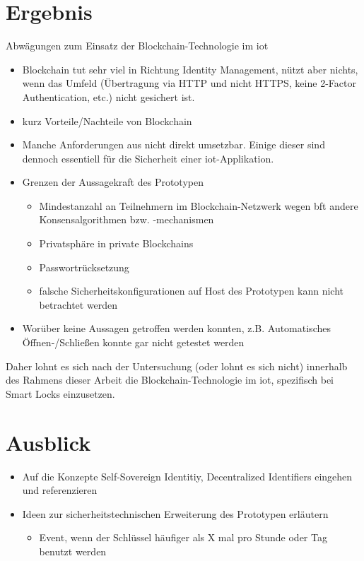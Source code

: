 \section{Ergebnis}
\label{sec:end}
    Abwägungen zum Einsatz der Blockchain-Technologie im \gls{iot}
    \begin{itemize}[noitemsep]
        \item Blockchain tut sehr viel in Richtung Identity Management, nützt aber nichts, wenn das Umfeld (Übertragung via HTTP und nicht HTTPS, keine 2-Factor Authentication, etc.) nicht gesichert ist.
        \item kurz Vorteile/Nachteile von Blockchain
        \item Manche Anforderungen aus  nicht direkt umsetzbar.
            Einige dieser sind dennoch essentiell für die Sicherheit einer \gls{iot}-Applikation.
        \item Grenzen der Aussagekraft des Prototypen
		    \begin{itemize}[noitemsep]
		        \item Mindestanzahl an Teilnehmern im Blockchain-Netzwerk wegen \gls{bft} \textrightarrow andere Konsensalgorithmen bzw. -mechanismen
		        \item Privatsphäre in private Blockchains
		        \item Passwortrücksetzung
		        \item falsche Sicherheitskonfigurationen auf Host des Prototypen kann nicht betrachtet werden
		    \end{itemize}
		\item Worüber keine Aussagen getroffen werden konnten, z.B. Automatisches Öffnen-/\-Schließen konnte gar nicht getestet werden
    \end{itemize}
    Daher lohnt es sich nach der Untersuchung (oder lohnt es sich nicht) innerhalb des Rahmens dieser Arbeit die Blockchain-Technologie im \gls{iot}, spezifisch bei Smart Locks einzusetzen.
    
    
\section{Ausblick}
\label{sec:end_further}
	\begin{itemize}[noitemsep]
		\item Auf die Konzepte Self-Sovereign Identitiy, Decentralized Identifiers eingehen und referenzieren
		\item Ideen zur sicherheitstechnischen Erweiterung des Prototypen erläutern
		\begin{itemize}[noitemsep]
		    \item Event, wenn der Schlüssel häufiger als X mal pro Stunde oder Tag benutzt werden
		\end{itemize}
	\end{itemize}
